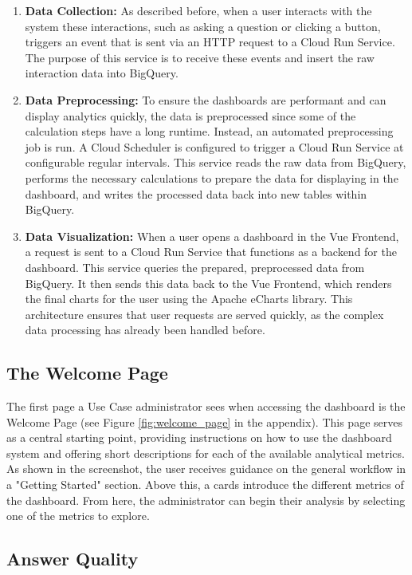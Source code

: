\documentclass[
	english,
	ruledheaders=section,%
	class=report,%
	thesis={type=bachelor},%
	accentcolor=1b,%
	custommargins=true,%
	marginpar=false,%
	parskip=half-,%
	fontsize=11pt,%
	DIV=14,
]{tudapub}
\begin{document}
\begin{enumerate}
    \item \textbf{Data Collection:} As described before, when a user interacts with the system these interactions, such as asking a question or clicking a button, triggers an event that is sent via an HTTP request to a Cloud Run Service. The purpose of this service is to receive these events and insert the raw interaction data into BigQuery.

    \item \textbf{Data Preprocessing:} To ensure the dashboards are performant and can display analytics quickly, the data is preprocessed since some of the calculation steps have a long runtime. Instead, an automated preprocessing job is run. A Cloud Scheduler \parencite{googlecloudscheduler} is configured to trigger a Cloud Run Service at configurable regular intervals. This service reads the raw data from BigQuery, performs the necessary calculations to prepare the data for displaying in the dashboard, and writes the processed data back into new tables within BigQuery.

    \item \textbf{Data Visualization:} When a user opens a dashboard in the Vue Frontend, a request is sent to a Cloud Run Service that functions as a backend for the dashboard. This service queries the prepared, preprocessed data from BigQuery. It then sends this data back to the Vue Frontend, which renders the final charts for the user using the Apache eCharts \parencite{apache_echarts} library. This architecture ensures that user requests are served quickly, as the complex data processing has already been handled before.
\end{enumerate}
\subsection{The Welcome Page}
The first page a Use Case administrator sees when accessing the dashboard is the Welcome Page (see Figure \ref{fig:welcome_page} in the appendix). This page serves as a central starting point, providing instructions on how to use the dashboard system and offering short descriptions for each of the available analytical metrics. As shown in the screenshot, the user receives guidance on the general workflow in a "Getting Started" section. Above this, a cards introduce the different metrics of the dashboard. From here, the administrator can begin their analysis by selecting one of the metrics to explore.
\subsection{Answer Quality}
\end{document}
